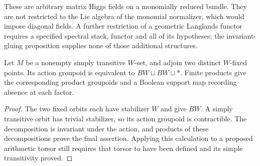 These are arbitrary matrix Higgs fields on a monomially reduced bundle.
They are not restricted to the Lie algebra of the monomial normalizer,
which would impose diagonal fields. A further restriction of a geometric
Langlands functor requires a specified spectral stack, functor and all of
its hypotheses; the invariant-gluing proposition supplies none of those
additional structures.

\begin{proposition}\label{prop:split-torsor}
Let $M$ be a nonempty simply transitive $W$-set, and adjoin two distinct
$W$-fixed points. Its action groupoid is equivalent to
$BW\sqcup BW\sqcup *$. Finite products give the corresponding product
groupoids and a Boolean support map recording absence at each factor.
\end{proposition}
\begin{proof}
The two fixed orbits each have stabilizer $W$ and give $BW$. A simply
transitive orbit has trivial stabilizer, so its action groupoid is
contractible. The decomposition is invariant under the action, and
products of these decompositions prove the final assertion. Applying this
calculation to a proposed arithmetic torsor still requires that torsor to
have been defined and its simple transitivity proved.
\end{proof}
